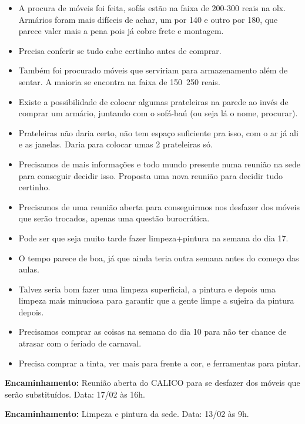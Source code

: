 \documentclass{ata-calico}
\begin{document}
\maketitle

\begin{itemize}
\item A procura de móveis foi feita, sofás estão na faixa de 200-300 reais na olx. Armários foram mais difíceis de achar, um por 140 e outro por 180, que parece valer mais a pena pois já cobre frete e montagem.
\item Precisa conferir se tudo cabe certinho antes de comprar.
\item Também foi procurado móveis que serviriam para armazenamento além de sentar. A maioria se encontra na faixa de 150~250 reais.
\item Existe a possibilidade de colocar algumas prateleiras na parede ao invés de comprar um armário, juntando com o sofá-baú (ou seja lá o nome, procurar).
\item Prateleiras não daria certo, não tem espaço suficiente pra isso, com o ar já ali e as janelas. Daria para colocar umas 2 prateleiras só.
\item Precisamos de mais informações e todo mundo presente numa reunião na sede para conseguir decidir isso. Proposta uma nova reunião para decidir tudo certinho.
\item Precisamos de uma reunião aberta para conseguirmos nos desfazer dos móveis que serão trocados, apenas uma questão burocrática.
\item Pode ser que seja muito tarde fazer limpeza+pintura na semana do dia 17.
\item O tempo parece de boa, já que ainda teria outra semana antes do começo das aulas.
\item Talvez seria bom fazer uma limpeza superficial, a pintura e depois uma limpeza mais minuciosa para garantir que a gente limpe a sujeira da pintura depois.
\item Precisamos comprar as coisas na semana do dia 10 para não ter chance de atrasar com o feriado de carnaval.
\item Precisa comprar a tinta, ver mais para frente a cor, e ferramentas para pintar.
\end{itemize}

\textbf{Encaminhamento:} Reunião aberta do CALICO para se desfazer dos móveis que serão substituídos. Data: 17/02 às 16h.

\textbf{Encaminhamento:} Limpeza e pintura da sede. Data: 13/02 às 9h.
\end{document}
